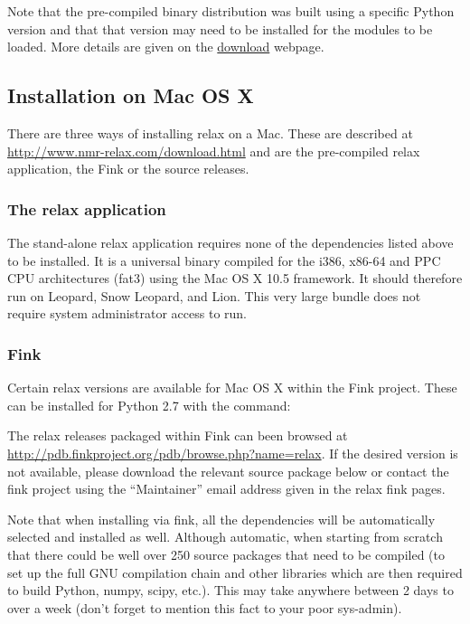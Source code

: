 

Note that the pre-compiled binary distribution was built using a specific Python version and that that version may need to be installed for the modules to be loaded.
More details are given on the \href{http://www.nmr-relax.com/download.html}{download} webpage.


\subsection{Installation on Mac OS X}

There are three ways of installing relax on a Mac.
These are described at \href{http://www.nmr-relax.com/download.html}{http://www.nmr-relax.com/download.html} and are the pre-compiled relax application, the Fink or the source releases.

\subsubsection{The relax application}

The stand-alone relax application requires none of the dependencies listed above to be installed.
It is a universal binary compiled for the i386, x86-64 and PPC CPU architectures (fat3) using the Mac OS X 10.5 framework.
It should therefore run on Leopard, Snow Leopard, and Lion.
This very large bundle does not require system administrator access to run.

\subsubsection{Fink}

Certain relax versions are available for Mac OS X within the Fink project.
These can be installed for Python 2.7 with the command:


The relax releases packaged within Fink can been browsed at \href{http://pdb.finkproject.org/pdb/browse.php?name=relax}{http://pdb.finkproject.org/pdb/browse.php?name=relax}.
If the desired version is not available, please download the relevant source package below or contact the fink project using the ``Maintainer'' email address given in the relax fink pages.

Note that when installing via fink, all the dependencies will be automatically selected and installed as well.
Although automatic, when starting from scratch that there could be well over 250 source packages that need to be compiled (to set up the full GNU compilation chain and other libraries which are then required to build Python, numpy, scipy, etc.).
This may take anywhere between 2 days to over a week (don't forget to mention this fact to your poor sys-admin).

